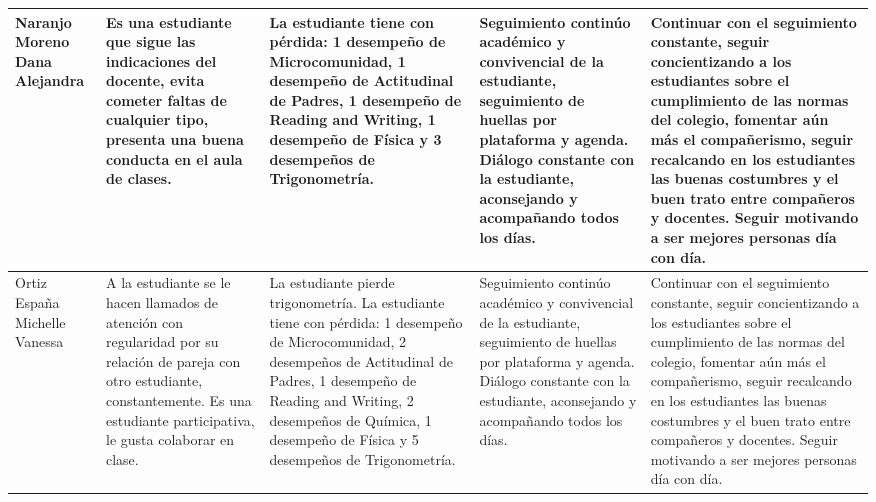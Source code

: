 \documentclass[spanish,11pt,a4paper]{article}
\begin{document}
\begin{longtable}{|p{3.5cm}|p{3.5cm}|p{3.5cm}|p{3.5cm}|p{3.5cm}|}
		Naranjo Moreno Dana Alejandra & 
		Es una estudiante que sigue las indicaciones del docente, evita cometer faltas de cualquier tipo, presenta una buena conducta en el aula de clases. & 
		La estudiante tiene con pérdida:  1 desempeño de Microcomunidad, 1 desempeño de Actitudinal de Padres, 1 desempeño de Reading and Writing, 1 desempeño de Física y 3 desempeños de Trigonometría. & 
		Seguimiento continúo académico y convivencial de la estudiante, seguimiento de huellas por plataforma y agenda. Diálogo constante con la estudiante, aconsejando y acompañando todos los días. & 
		Continuar con el seguimiento constante, seguir concientizando a los estudiantes sobre el cumplimiento de las normas del colegio, fomentar aún más el compañerismo, seguir recalcando en los estudiantes las buenas costumbres y el buen trato entre compañeros y docentes. Seguir motivando a ser mejores personas día con día.\\
		\hline
		
		Ortiz España Michelle Vanessa & 
		A la estudiante se le hacen llamados de atención con regularidad por su relación de pareja con otro estudiante, constantemente. Es una estudiante participativa, le gusta colaborar en clase. & 
		La estudiante pierde trigonometría. 
		La estudiante tiene con pérdida: 1 desempeño de Microcomunidad, 2 desempeños de Actitudinal de Padres, 1 desempeño de Reading and Writing, 2 desempeños de Química, 1 desempeño de Física y 5 desempeños de Trigonometría.& 
		Seguimiento continúo académico y convivencial de la estudiante, seguimiento de huellas por plataforma y agenda. Diálogo constante con la estudiante, aconsejando y acompañando todos los días. & 
		Continuar con el seguimiento constante, seguir concientizando a los estudiantes sobre el cumplimiento de las normas del colegio, fomentar aún más el compañerismo, seguir recalcando en los estudiantes las buenas costumbres y el buen trato entre compañeros y docentes. Seguir motivando a ser mejores personas día con día.\\
		\hline
		

\end{longtable}
\end{document}
